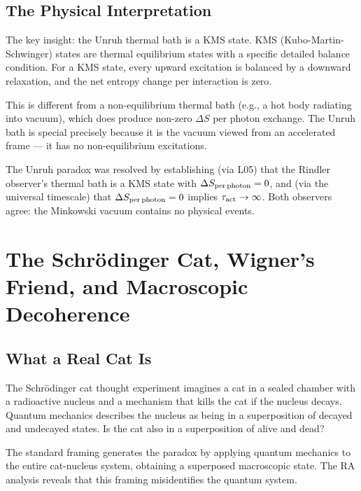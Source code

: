 \documentclass[12pt,a4paper]{article}
\begin{document}
\subsection{The Physical Interpretation}

The key insight: the Unruh thermal bath is a KMS state.  KMS (Kubo-Martin-Schwinger) states are thermal equilibrium states with a specific detailed balance condition.  For a KMS state, every upward excitation is balanced by a downward relaxation, and the net entropy change per interaction is zero.

This is different from a non-equilibrium thermal bath (e.g., a hot body radiating into vacuum), which does produce non-zero $\Delta S$ per photon exchange.  The Unruh bath is special precisely because it is the vacuum viewed from an accelerated frame --- it has no non-equilibrium excitations.

The Unruh paradox was resolved by establishing (via L05) that the Rindler observer's thermal bath is a KMS state with $\Delta S_{\rm per\,photon}=0$, and (via the universal timescale) that $\Delta S_{\rm per\,photon}=0$ implies $\tau_{\rm act}\to\infty$.  Both observers agree: the Minkowski vacuum contains no physical events.

\section{The Schr\"odinger Cat, Wigner's Friend, and Macroscopic Decoherence}\label{sec:cat}

\subsection{What a Real Cat Is}

The Schr\"odinger cat thought experiment \cite{Schrodinger1935} imagines a cat in a sealed chamber with a radioactive nucleus and a mechanism that kills the cat if the nucleus decays.  Quantum mechanics describes the nucleus as being in a superposition of decayed and undecayed states.  Is the cat also in a superposition of alive and dead?

The standard framing generates the paradox by applying quantum mechanics to the entire cat-nucleus system, obtaining a superposed macroscopic state.  The RA analysis reveals that this framing misidentifies the quantum system.
\end{document}
